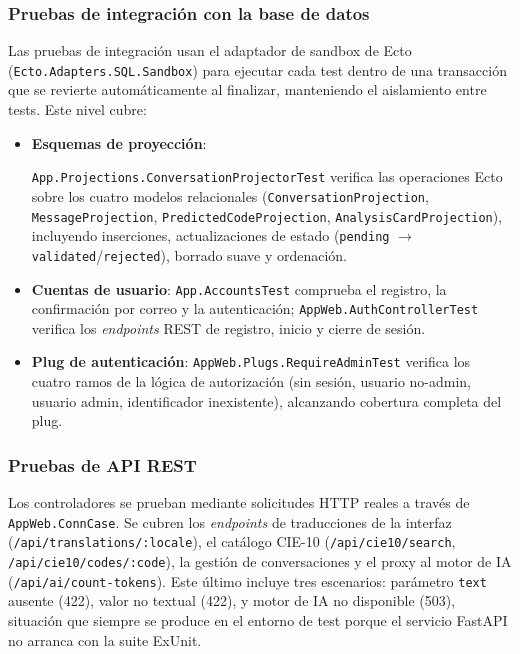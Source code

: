 \subsubsection*{Pruebas de integración con la base de datos}

Las pruebas de integración usan el adaptador de sandbox de Ecto (\texttt{Ecto.\allowbreak{}Adapters.\allowbreak{}SQL.\allowbreak{}Sandbox}) para ejecutar cada test dentro de una transacción que se revierte automáticamente al finalizar, manteniendo el aislamiento entre tests. Este nivel cubre:

\begin{itemize}
 \item \textbf{Esquemas de proyección}: \begin{sloppypar}\texttt{App.\allowbreak{}Projections.\allowbreak{}ConversationProjectorTest} verifica las operaciones Ecto sobre los cuatro modelos relacionales (\texttt{ConversationProjection}, \mbox{\texttt{MessageProjection}}, \texttt{PredictedCodeProjection}, \texttt{Analys\-isCardProjection}), incluyendo inserciones, actualizaciones de estado (\texttt{pending} $\to$ \texttt{validated}/\texttt{rejected}), borrado suave y ordenación.\end{sloppypar}
 \item \textbf{Cuentas de usuario}: \texttt{App.AccountsTest} comprueba el registro, la confirmación por correo y la autenticación; \texttt{AppWeb.AuthControllerTest} verifica los \emph{endpoints} REST de registro, inicio y cierre de sesión.
 \item \textbf{Plug de autenticación}: \texttt{AppWeb.Plugs.RequireAdminTest} verifica los cuatro ramos de la lógica de autorización (sin sesión, usuario no-admin, usuario admin, identificador inexistente), alcanzando cobertura completa del plug.
\end{itemize}

\subsubsection*{Pruebas de API REST}

Los controladores se prueban mediante solicitudes HTTP reales a través de \texttt{AppWeb.\allowbreak{}ConnCase}. Se cubren los \emph{endpoints} de traducciones de la interfaz (\texttt{/api/translations/\allowbreak{}:locale}), el catálogo CIE-10 (\texttt{/api/cie10/search}, \texttt{/api/cie10/codes/:code}), la gestión de conversaciones y el proxy al motor de IA (\texttt{/api/ai/count-tokens}). Este último incluye tres escenarios: parámetro \texttt{text} ausente (422), valor no textual (422), y motor de IA no disponible (503), situación que siempre se produce en el entorno de test porque el servicio FastAPI no arranca con la suite ExUnit.

